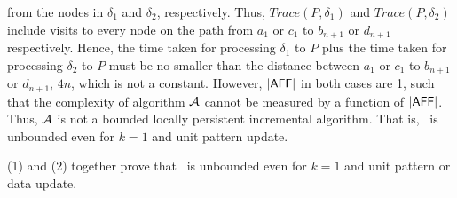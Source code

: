 from the nodes in $\delta_1$ and $\delta_2$, respectively.
Thus, $Trace(P, \delta_1)$ and $Trace(P, \delta_2)$ include visits to every node on the path from $a_1$ or $c_1$ to $b_{n+1}$ or $d_{n+1}$ respectively.
Hence, the time taken for processing $\delta_1$ to $P$ plus the time taken for processing $\delta_2$ to $P$ must be no smaller than the distance between $a_1$ or $c_1$ to $b_{n+1}$ or $d_{n+1}$, \ie $4n$, which is not a constant.
However, $|{\mathsf{AFF}}|$ in both cases are 1, such that the complexity of algorithm ${\cal A}$ cannot be measured by a function of $|{\mathsf{AFF}}|$.
Thus, ${\cal A}$ is not a bounded locally persistent incremental algorithm.
That is, \dynteamF\, is unbounded even for $k=1$ and unit pattern update.

\vspace{-1.5ex}
(1) and (2) together prove that \dynteamF\, is unbounded even for $k=1$ and unit pattern or data update.


